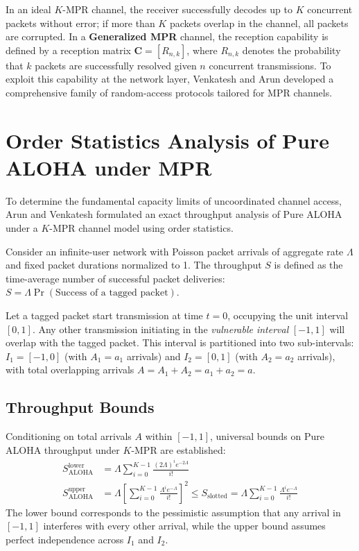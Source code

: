 In an ideal $K$-MPR channel, the receiver successfully decodes up to $K$ concurrent packets without error; if more than $K$ packets overlap in the channel, all packets are corrupted. In a \textbf{Generalized MPR} channel, the reception capability is defined by a reception matrix $\mathbf{C} = [R_{n,k}]$, where $R_{n,k}$ denotes the probability that $k$ packets are successfully resolved given $n$ concurrent transmissions. To exploit this capability at the network layer, Venkatesh and Arun \cite{arun2013order, balan2015analysis, arun2017design} developed a comprehensive family of random-access protocols tailored for MPR channels.

\section{Order Statistics Analysis of Pure ALOHA under MPR}
To determine the fundamental capacity limits of uncoordinated channel access, Arun and Venkatesh \cite{arun2013order} formulated an exact throughput analysis of Pure ALOHA under a $K$-MPR channel model using order statistics. 

Consider an infinite-user network with Poisson packet arrivals of aggregate rate $\Lambda$ and fixed packet durations normalized to 1. The throughput $S$ is defined as the time-average number of successful packet deliveries: $S = \Lambda \Pr(\text{Success of a tagged packet})$.

Let a tagged packet start transmission at time $t=0$, occupying the unit interval $[0, 1]$. Any other transmission initiating in the \textit{vulnerable interval} $[-1, 1]$ will overlap with the tagged packet. This interval is partitioned into two sub-intervals: $I_1 = [-1, 0]$ (with $A_1 = a_1$ arrivals) and $I_2 = [0, 1]$ (with $A_2 = a_2$ arrivals), with total overlapping arrivals $A = A_1 + A_2 = a_1 + a_2 = a$.

\subsection{Throughput Bounds}
Conditioning on total arrivals $A$ within $[-1, 1]$, universal bounds on Pure ALOHA throughput under $K$-MPR are established:
\begin{align}
    S_{\text{ALOHA}}^{\text{lower}} &= \Lambda \sum_{i=0}^{K-1} \frac{(2\Lambda)^i e^{-2\Lambda}}{i!} \label{eq:mpr_aloha_lower} \\
    S_{\text{ALOHA}}^{\text{upper}} &= \Lambda \left[ \sum_{i=0}^{K-1} \frac{\Lambda^i e^{-\Lambda}}{i!} \right]^2 \le S_{\text{slotted}} = \Lambda \sum_{i=0}^{K-1} \frac{\Lambda^i e^{-\Lambda}}{i!} \label{eq:mpr_aloha_upper}
\end{align}
The lower bound corresponds to the pessimistic assumption that any arrival in $[-1, 1]$ interferes with every other arrival, while the upper bound assumes perfect independence across $I_1$ and $I_2$.


